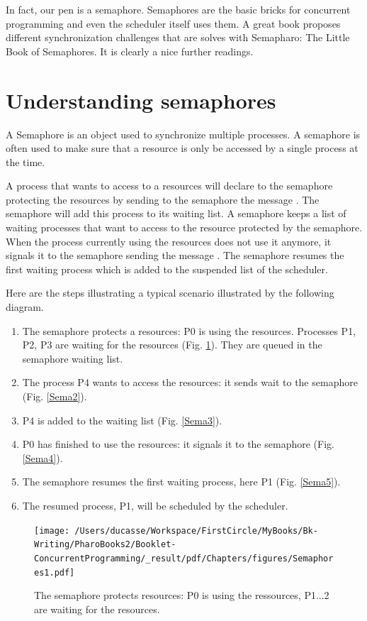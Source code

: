 \documentclass[10pt,twoside,english]{_support/latex/sbabook/sbabook}
\begin{document}
In fact, our pen is a semaphore. Semaphores are the basic bricks for concurrent programming and even the scheduler itself uses them. 
A great book proposes different synchronization challenges that are solves with Semapharo: The Little Book of Semaphores.
It is clearly a nice further readings. 
\section{Understanding semaphores}
A Semaphore is an object used to synchronize multiple processes.
A semaphore is often used to make sure that a resource is only be accessed by a single process at the time.

A process that wants to access to a resources will declare to the semaphore protecting the resources by sending
to the semaphore the message . 
The semaphore will add this process to its waiting list. 
A semaphore keeps a list of waiting processes that want to access to the resource protected by the semaphore.
When the process currently using the resources does not use it anymore, it signals it to the semaphore sending the message . 
The semaphore resumes the first waiting process which is added to the suspended list of the scheduler.

Here are the steps illustrating a typical scenario illustrated by the following diagram.

\begin{enumerate}
\item The semaphore protects a resources: P0 is using the resources. Processes P1, P2, P3 are waiting for the resources (Fig. \ref{Sema1}). They are queued in the semaphore waiting list.
\item The process P4 wants to access the resources: it sends wait to the semaphore (Fig. \ref{Sema2}).
\item P4 is added to the waiting list (Fig. \ref{Sema3}).
\item P0 has finished to use the resources: it signals it to the semaphore (Fig. \ref{Sema4}).
\item The semaphore resumes the first waiting process, here P1 (Fig. \ref{Sema5}).
\item The resumed process, P1, will be scheduled by the scheduler.
\end{enumerate}


\begin{figure}

\begin{center}
\texttt{[image: /Users/ducasse/Workspace/FirstCircle/MyBooks/Bk-Writing/PharoBooks2/Booklet-ConcurrentProgramming/\_result/pdf/Chapters/figures/Semaphores1.pdf]}\caption{The semaphore protects resources: P0 is using the ressources, P1...2 are waiting for the resources. \label{Sema1}}\end{center}
\end{figure}
\end{document}

